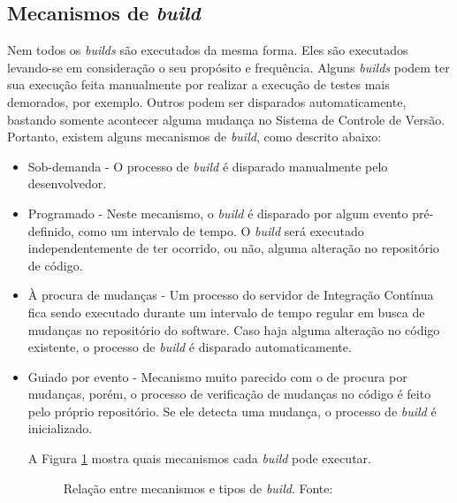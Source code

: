 \subsection{Mecanismos de \textit{build}}

Nem todos os \textit{builds} são executados da mesma forma. Eles são executados levando-se em consideração o seu propósito e frequência. Alguns \textit{builds} podem ter sua execução feita manualmente por realizar a execução de testes mais demorados, por exemplo. Outros podem ser disparados automaticamente, bastando somente acontecer alguma mudança no Sistema de Controle de Versão. Portanto, existem alguns mecanismos de \textit{build}, como descrito abaixo:

\begin{itemize}
    \item{Sob-demanda} - O processo de \textit{build} é disparado manualmente pelo desenvolvedor.
    \item{Programado} - Neste mecanismo, o \textit{build} é disparado por algum evento pré-definido, como um intervalo de tempo. O \textit{build} será executado independentemente de ter ocorrido, ou não, alguma alteração no repositório de código.
    \item{À procura de mudanças} - Um processo do servidor de Integração Contínua fica sendo executado durante um intervalo de tempo regular em busca de mudanças no repositório do software. Caso haja alguma alteração no código existente, o processo de \textit{build} é disparado automaticamente.
    \item{Guiado por evento} - Mecanismo muito parecido com o de procura por mudanças, porém, o processo de verificação de mudanças no código é feito pelo próprio repositório. Se ele detecta uma mudança, o processo de \textit{build} é inicializado.

A Figura \ref{mecanismos} mostra quais mecanismos cada \textit{build} pode executar.

\begin{figure}[ht]
    \centering
    \caption{Relação entre mecanismos e tipos de \textit{build}. Fonte: \cite{DUVALL}}
    \label{mecanismos}
\end{figure}
\end{itemize}

